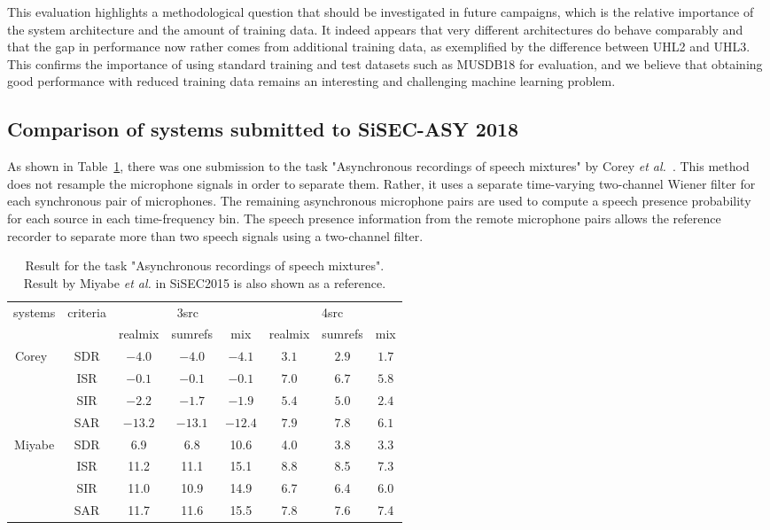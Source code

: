 \documentclass{llncs}
\begin{document}
 This evaluation highlights a methodological question that should be investigated in future campaigns, which is the relative importance of the system architecture and the amount of training data. It indeed appears that very different architectures do behave comparably and that the gap in performance now rather comes from additional training data, as exemplified by the difference between UHL2 and UHL3. This confirms the importance of using standard training and test datasets such as MUSDB18 for evaluation, and we believe that obtaining good performance with reduced training data remains an interesting and challenging machine learning problem.


\subsection{Comparison of systems submitted to SiSEC-ASY 2018}
As shown in Table~\ref{table}, there was one submission to the task "Asynchronous recordings of speech mixtures" by Corey {\it et al.}~\cite{corey}.
This method does not resample the microphone signals in order to separate them. Rather, it uses a separate time-varying two-channel Wiener filter for each synchronous pair of microphones. The remaining asynchronous microphone pairs are used to compute a speech presence probability for each source in each time-frequency bin. The speech presence information from the remote microphone pairs allows the reference recorder to separate more than two speech signals using a two-channel filter.

\begin{table}
\centering
\caption{Result for the task "Asynchronous recordings of speech mixtures". Result by Miyabe {\it et al.} in SiSEC2015 is also shown as a reference.}
\label{table}
\begin{tabular}{|c|c|ccc|ccc|}\hline
systems&criteria&\multicolumn{3}{|c|}{3src}&\multicolumn{3}{|c|}{4src}\\
&&realmix&sumrefs&mix&realmix&sumrefs&mix\\\hline
Corey~\cite{corey}&SDR&$-4.0$&$-4.0$&$-4.1$&$3.1$&$2.9$&$1.7$\\
&ISR&$-0.1$&$-0.1$&$-0.1$&$7.0$&$6.7$&$5.8$\\
&SIR&$-2.2$&$-1.7$&$-1.9$&$5.4$&$5.0$&$2.4$\\
&SAR&$-13.2$&$-13.1$&$-12.4$&$7.9$&$7.8$&$6.1$\\\hline
Miyabe&SDR&6.9&6.8&10.6&4.0&3.8&3.3\\
&ISR&11.2&11.1&15.1&8.8&8.5&7.3\\
&SIR&11.0&10.9&14.9&6.7&6.4&6.0\\
&SAR&11.7&11.6&15.5&7.8&7.6&7.4\\\hline
\end{tabular}
\end{table}
\end{document}
